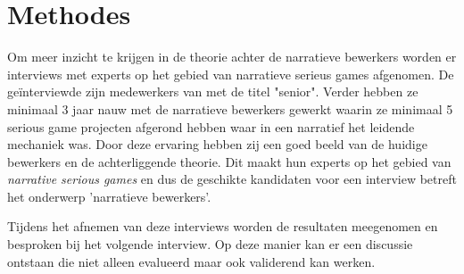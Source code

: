 \chapter{Methodes}


Om meer inzicht te krijgen in de theorie achter de narratieve bewerkers worden er interviews met experts op het gebied van narratieve serieus games afgenomen. De geïnterviewde zijn medewerkers van \organisation{} met de titel "senior". Verder hebben ze minimaal 3 jaar nauw met de narratieve bewerkers gewerkt waarin ze minimaal 5 serious game projecten afgerond hebben waar in een narratief het leidende mechaniek was. Door deze ervaring hebben zij een goed beeld van de huidige bewerkers en de achterliggende theorie. Dit maakt hun experts op het gebied van \emph{narrative serious games} en dus de geschikte kandidaten voor een interview betreft het onderwerp 'narratieve bewerkers'.

Tijdens het afnemen van deze interviews worden de resultaten meegenomen en besproken bij het volgende interview. Op deze manier kan er een discussie ontstaan die niet alleen evalueerd maar ook validerend kan werken.


